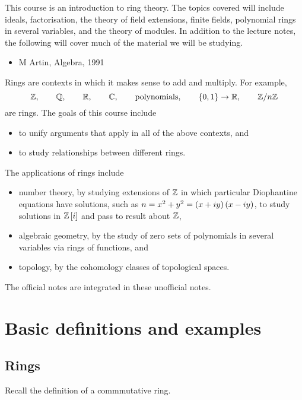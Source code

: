 This course is an introduction to ring theory. The topics covered will include ideals, factorisation, the theory of field extensions, finite fields, polynomial rings in several variables, and the theory of modules. In addition to the lecture notes, the following will cover much of the material we will be studying.
\begin{itemize}
\item M Artin, Algebra, 1991
\end{itemize}
Rings are contexts in which it makes sense to add and multiply. For example,
$$ \ZZ, \qquad \QQ, \qquad \RR, \qquad \CC, \qquad \text{polynomials}, \qquad \cbr{0, 1} \to \RR, \qquad \ZZ / n\ZZ $$
are rings. The goals of this course include
\begin{itemize}
\item to unify arguments that apply in all of the above contexts, and
\item to study relationships between different rings.
\end{itemize}
The applications of rings include
\begin{itemize}
\item number theory, by studying extensions of $ \mathbb{Z} $ in which particular Diophantine equations have solutions, such as $ n = x^2 + y^2 = \br{x + iy}\br{x - iy} $, to study solutions in $ \ZZ\sbr{i} $ and pass to result about $ \mathbb{Z} $,
\item algebraic geometry, by the study of zero sets of polynomials in several variables via rings of functions, and
\item topology, by the cohomology classes of topological spaces.
\end{itemize}

\begin{note*}
The official notes are integrated in these unofficial notes.
\end{note*}

\pagebreak

\section{Basic definitions and examples}

\subsection{Rings}

Recall the definition of a commmutative ring.

